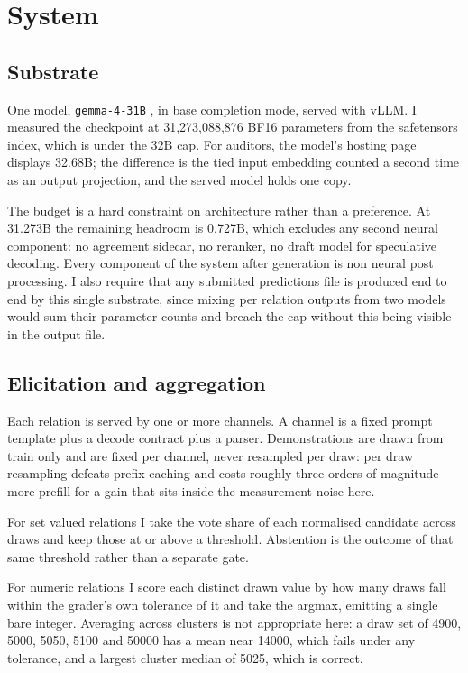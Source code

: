\documentclass[11pt]{article}
\begin{document}
\section{System}

\subsection{Substrate}

One model, \texttt{gemma-4-31B} \cite{gemma431b}, in base completion mode,
served with vLLM. I measured the checkpoint at 31,273,088,876 BF16 parameters
from the safetensors index, which is under the 32B cap. For auditors, the model's
hosting page displays 32.68B; the difference is the tied input embedding counted
a second time as an output projection, and the served model holds one copy.

The budget is a hard constraint on architecture rather than a preference. At
31.273B the remaining headroom is 0.727B, which excludes any second neural
component: no agreement sidecar, no reranker, no draft model for speculative
decoding. Every component of the system after generation is non neural post
processing. I also require that any submitted predictions file is produced end to
end by this single substrate, since mixing per relation outputs from two models
would sum their parameter counts and breach the cap without this being visible in
the output file.

\subsection{Elicitation and aggregation}

Each relation is served by one or more channels. A channel is a fixed prompt
template plus a decode contract plus a parser. Demonstrations are drawn from
train only and are fixed per channel, never resampled per draw: per draw
resampling defeats prefix caching and costs roughly three orders of magnitude
more prefill for a gain that sits inside the measurement noise here.

For set valued relations I take the vote share of each normalised candidate
across draws and keep those at or above a threshold. Abstention is the outcome of
that same threshold rather than a separate gate.

For numeric relations I score each distinct drawn value by how many draws fall
within the grader's own tolerance of it and take the argmax, emitting a single
bare integer. Averaging across clusters is not appropriate here: a draw set of
4900, 5000, 5050, 5100 and 50000 has a mean near 14000, which fails under any
tolerance, and a largest cluster median of 5025, which is correct.
\end{document}
